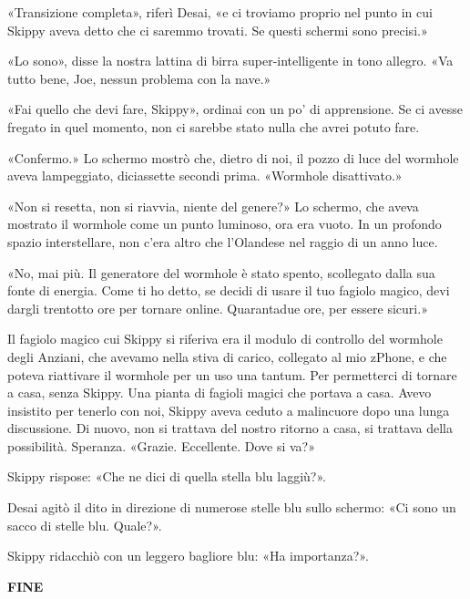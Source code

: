 «Transizione completa», riferì Desai, «e ci troviamo proprio nel punto
in cui Skippy aveva detto che ci saremmo trovati. Se questi schermi sono
precisi.»

«Lo sono», disse la nostra lattina di birra super-intelligente in tono
allegro. «Va tutto bene, Joe, nessun problema con la nave.»

«Fai quello che devi fare, Skippy», ordinai con un po' di apprensione.
Se ci avesse fregato in quel momento, non ci sarebbe stato nulla che
avrei potuto fare.

«Confermo.» Lo schermo mostrò che, dietro di noi, il pozzo di luce del
wormhole aveva lampeggiato, diciassette secondi prima. «Wormhole
disattivato.»

«Non si resetta, non si riavvia, niente del genere?» Lo schermo, che
aveva mostrato il wormhole come un punto luminoso, ora era vuoto. In un
profondo spazio interstellare, non c'era altro che l'Olandese nel raggio
di un anno luce.

«No, mai più. Il generatore del wormhole è stato spento, scollegato
dalla sua fonte di energia. Come ti ho detto, se decidi di usare il tuo
fagiolo magico, devi dargli trentotto ore per tornare online.
Quarantadue ore, per essere sicuri.»

Il fagiolo magico cui Skippy si riferiva era il modulo di controllo del
wormhole degli Anziani, che avevamo nella stiva di carico, collegato al
mio zPhone, e che poteva riattivare il wormhole per un uso una tantum.
Per permetterci di tornare a casa, senza Skippy. Una pianta di fagioli
magici che portava a casa. Avevo insistito per tenerlo con noi, Skippy
aveva ceduto a malincuore dopo una lunga discussione. Di nuovo, non si
trattava del nostro ritorno a casa, si trattava della possibilità.
Speranza. «Grazie. Eccellente. Dove si va?»

Skippy rispose: «Che ne dici di quella stella blu laggiù?».

Desai agitò il dito in direzione di numerose stelle blu sullo schermo:
«Ci sono un sacco di stelle blu. Quale?».

Skippy ridacchiò con un leggero bagliore blu: «Ha importanza?».

\hfill\break

\begin{center}
	\textbf{FINE}
\end{center}